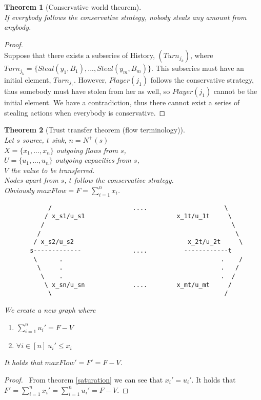 \documentclass[11pt]{article}
\newtheorem{theorem}{Theorem}[section]
\theoremstyle{definition}
\theoremstyle{corollary}
\theoremstyle{lemma}
\begin{document}
    \begin{theorem}[Conservative world theorem] \ \\
    \label{conservativeworld}
       If everybody follows the conservative strategy, nobody steals any amount from anybody.
    \end{theorem}
    \begin{proof} \ \\
       Suppose that there exists a subseries of History, $(Turn_{j_k})$, where $Turn_{j_k} = \{Steal(y_1,B_1),...,
       Steal(y_m,B_m)\}$. This subseries must have an initial element, $Turn_{j_1}$. However, $Player(j_1)$ follows the conservative
       strategy, thus somebody must have stolen from her as well, so $Player(j_1)$ cannot be the initial element. We have a
       contradiction, thus there cannot exist a series of stealing actions when everybody is conservative.
    \end{proof}

    \begin{theorem}[Trust transfer theorem (flow terminology)] \ \\
    \label{trusttransfer}
       Let $s$ source, $t$ sink, $n = N^{+}(s)$ \\
       $X = \{x_1, ..., x_n\}$ outgoing flows from $s$, \\
       $U = \{u_1, ..., u_n\}$ outgoing capacities from $s$, \\
       $V$ the value to be transferred. \\
       Nodes apart from $s$, $t$ follow the conservative strategy. \\
       Obviously $maxFlow = F = \sum\limits_{i=1}^{n}{x_i}$.
       {\em \begin{lstlisting}
            /                      ....                     \
           / x_s1/u_s1                         x_1t/u_1t     \
          /                                                   \
         /                                                     \
        / x_s2/u_s2                               x_2t/u_2t     \
       s-------------              ....          ------------t
        \      .                                           .    /
         \     .                                           .   /
          \    .                                           .  /
           \ x_sn/u_sn             ....        x_mt/u_mt     /
            \                                               /
       \end{lstlisting}}
       We create a new graph where
       \begin{enumerate}
         \item  $\sum\limits_{i=1}^{n}{u_i'} = F - V$
         \item $\forall i \in [n] \: u_i' \leq x_i$
       \end{enumerate}
 
       It holds that $maxFlow' = F' = F - V$.
    \end{theorem}
    \begin{proof} \
        From theorem \ref{saturation} we can see that $x_i' = u_i'$. It holds that $F' = \sum\limits_{i=1}^nx_i' =
        \sum\limits_{i=1}^nu_i' = F - V$.
    \end{proof}
\end{document}
